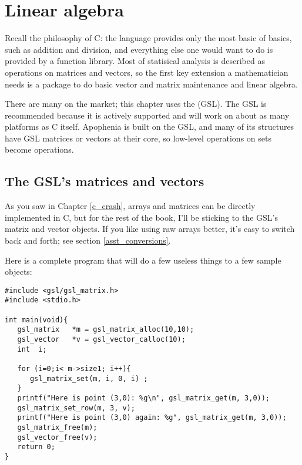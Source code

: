 \chapter[Linear Algebra]{Linear algebra} \label{linear_algebra}

Recall the philosophy of C: the language provides only the most basic of
basics, such as addition and division, and everything else one would
want to do is provided by a function library. Most of statisical analysis is
described as operations on matrices and vectors, so the first key
extension a mathematician needs is a package to do basic vector and
matrix maintenance and linear algebra.

There are many on the market; this chapter uses the  (GSL). The GSL is recommended because it is actively supported
and will work on about as many platforms as C itself. Apophenia is built
on the GSL, and many of its structures have GSL matrices or vectors at
their core, so low-level operations on  sets become
 operations.

\section{The GSL's matrices and vectors}
As you saw in Chapter \ref{c_crash}, arrays and matrices can be directly implemented in C, but for
the rest of the book, I'll be sticking to the GSL's matrix and vector objects.
If you like using raw arrays better, it's easy to switch back and forth; see
section \ref{asst_conversions}.


Here is a complete program that will do a few useless things to a few sample
objects:\label{gslexample}
\begin{lstlisting}
#include <gsl/gsl_matrix.h>
#include <stdio.h>

int main(void){
   gsl_matrix   *m = gsl_matrix_alloc(10,10);
   gsl_vector   *v = gsl_vector_calloc(10);
   int  i;

   for (i=0;i< m->size1; i++){
      gsl_matrix_set(m, i, 0, i) ;
   }
   printf("Here is point (3,0): %g\n", gsl_matrix_get(m, 3,0));
   gsl_matrix_set_row(m, 3, v);
   printf("Here is point (3,0) again: %g", gsl_matrix_get(m, 3,0));
   gsl_matrix_free(m);
   gsl_vector_free(v);
   return 0;
}
\end{lstlisting}
